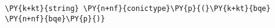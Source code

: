 \begin{Verbatim}[commandchars=\\\{\}]
    \PY{k+kt}{string} \PY{n+nf}{conictype}\PY{p}{(}\PY{k+kt}{bqe} \PY{n+nf}{bqe}\PY{p}{)}
\end{Verbatim}

